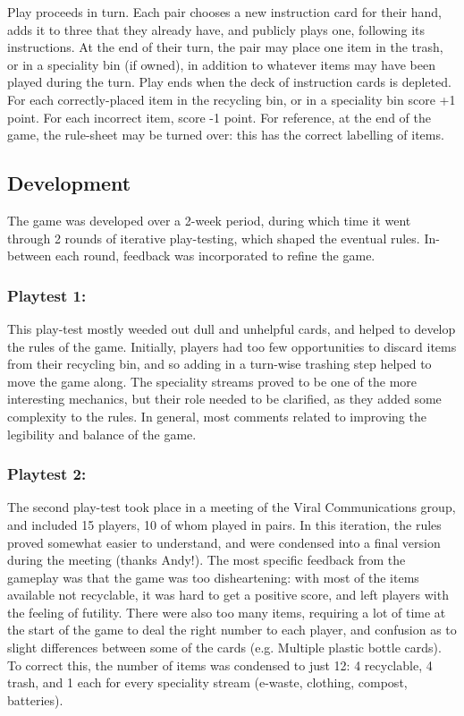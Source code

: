 \documentclass[nofonts,nols,justified,nobib]{tufte-book}
\begin{document}
Play proceeds in turn. Each pair chooses a new instruction card for their hand, adds it to three that they already have, and publicly plays one, following its instructions. At the end of their turn, the pair may place one item in the trash, or in a speciality bin (if owned), in addition to whatever items may have been played during the turn. 
Play ends when the deck of instruction cards is depleted. For each correctly-placed item in the recycling bin, or in a speciality bin score +1 point. For each incorrect item, score -1 point. For reference, at the end of the game, the rule-sheet may be turned over: this has the correct labelling of items. 


\subsection*{Development}

The game was developed over a 2-week period, during which time it went through 2 rounds of iterative play-testing, which shaped the eventual rules. In-between each round, feedback was incorporated to refine the game.

\subsubsection*{Playtest 1:}
This play-test mostly weeded out dull and unhelpful cards, and helped to develop the rules of the game. Initially, players had too few opportunities to discard items from their recycling bin, and so adding in a turn-wise trashing step helped to move the game along. The speciality streams proved to be one of the more interesting mechanics, but their role needed to be clarified, as they added some complexity to the rules. In general, most comments related to improving the legibility and balance of the game.

\subsubsection*{Playtest 2:}
The second play-test took place in a meeting of the Viral Communications group, and included 15 players, 10 of whom played in pairs. In this iteration, the rules proved somewhat easier to understand, and were condensed into a final version during the meeting (thanks Andy!).
The most specific feedback from the gameplay was that the game was too disheartening: with most of the items available not recyclable, it was hard to get a positive score, and left players with the feeling of futility. There were also too many items, requiring a lot of time at the start of the game to deal the right number to each player, and confusion as to slight differences between some of the cards (e.g. Multiple plastic bottle cards). To correct this, the number of items was condensed to just 12: 4 recyclable, 4 trash, and 1 each for every speciality stream (e-waste, clothing, compost, batteries).
\end{document}
